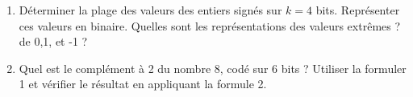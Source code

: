 \documentclass[a4paper,11pt]{article}
\begin{document}
\begin{enumerate}
\item Déterminer la plage des valeurs des entiers signés sur $k=4$ bits. Représenter ces valeurs en binaire. Quelles sont les représentations des valeurs extrêmes ? de 0,1, et -1 ?\\
%
%


\item Quel est le complément à 2 du nombre $8$, codé sur $6$ bits ? Utiliser la formuler 1 et vérifier le résultat en appliquant la formule 2.


\end{enumerate}
\end{document}
